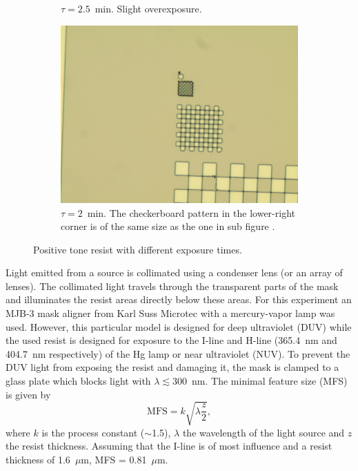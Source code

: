 \begin{figure}[!b]
\begin{subfigure}[t]{0.3\linewidth}
                    \caption{$\tau = 2.5$~min. Slight overexposure.}
                    \label{fig:b3e1}
                \end{subfigure}
                \hfill
                \begin{subfigure}[t]{0.3\linewidth}
                    \centering
                    \includegraphics[width=\textwidth]{data/b3a1.jpg}
                    \caption{$\tau = 2$~min. The checkerboard pattern in the lower-right corner is of the same size as the one in sub figure .}
                    \label{fig:b3a1}
                \end{subfigure}
                \caption{Positive tone resist with different exposure times.}
            \end{figure}
Light emitted from a source is collimated using a condenser lens (or an array of lenses). The collimated light travels through the transparent parts of the mask and illuminates the resist areas directly below these areas. For this experiment an MJB-3 mask aligner from Karl Suss Microtec with a mercury-vapor lamp was used. However, this particular model is designed for deep ultraviolet (DUV) while the used resist is designed for exposure to the I-line and H-line (365.4~nm and 404.7~nm respectively) of the Hg lamp or near ultraviolet (NUV). To prevent the DUV light from exposing the resist and damaging it, the mask is clamped to a glass plate which blocks light with $\lambda \lesssim 300$~nm. The minimal feature size (MFS) is given by
\begin{equation*}
    \text{MFS} = k\sqrt{\lambda \frac{z}{2}},
\end{equation*} where $k$ is the process constant ($\sim$1.5), $\lambda$ the wavelength of the light source and $z$ the resist thickness. Assuming that the I-line is of most influence and a resist thickness of 1.6~$\mu$m, MFS = 0.81~$\mu$m.

